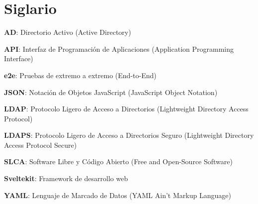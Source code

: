 \section*{Siglario}

\textbf{AD}: Directorio Activo (Active Directory)

\textbf{API}: Interfaz de Programación de Aplicaciones (Application Programming Interface)

\textbf{e2e}: Pruebas de extremo a extremo (End-to-End)

\textbf{JSON}: Notación de Objetos JavaScript (JavaScript Object Notation)

\textbf{LDAP}: Protocolo Ligero de Acceso a Directorios (Lightweight Directory Access Protocol)

\textbf{LDAPS}: Protocolo Ligero de Acceso a Directorios Seguro (Lightweight Directory Access Protocol Secure)

\textbf{SLCA}: Software Libre y Código Abierto (Free and Open-Source Software)

\textbf{Sveltekit}: Framework de desarrollo web

\textbf{YAML}: Lenguaje de Marcado de Datos (YAML Ain't Markup Language)

